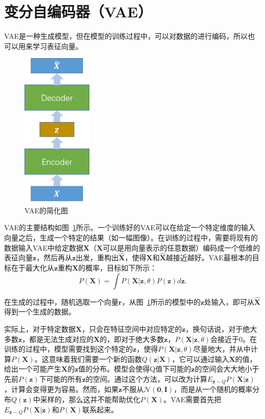 \section{变分自编码器（VAE）}
VAE是一种生成模型，但在模型的训练过程中，可以对数据的进行编码，所以也可以用来学习表征向量。\par
\begin{figure}[h]
  \centering
  \includegraphics[width=0.3\textwidth]{VAE.png}
  \caption{VAE的简化图}
  \label{fig:vae}
\end{figure}
VAE的主要结构如图~\ref{fig:vae}所示。一个训练好的VAE可以在给定一个特定维度的输入向量之后，生成一个特定的结果（如一幅图像）。在训练的过程中，需要将现有的数据输入VAE中给定数据$\bm X$（$\bm X$可以是用向量表示的任意数据）编码成一个低维的表征向量$\bm z$，然后再从$\bm z$出发，重构出$\bm{\hat X}$，使得$\bm X$和$\bm{\hat X}$越接近越好。VAE最根本的目标在于最大化从$\bm z$重构$\bm X$的概率，目标如下所示：
\begin{equation}
\label{eq:baseeq}
P(\bm X)=\int P(\bm X|\bm z, \theta)P(\bm z)d\bm z.
\end{equation}

在生成的过程中，随机选取一个向量$\bm r$，从图~\ref{fig:vae}所示的模型中的$\bm z$处输入，即可从$\bm{\hat X}$得到一个生成的数据。\par

实际上，对于特定数据$\bm X$，只会在特征空间中对应特定的$\bm z$，换句话说，对于绝大多数$\bm z$，都是无法生成对应的$\bm X$的，即对于绝大多数$\bm z$，$P(\bm X|\bm z, \theta)$会接近于0。在训练的过程中，模型需要找到这个特定的$\bm z$，使得$P(\bm X|\bm z, \theta)$尽量地大，并从中计算$P(\bm X)$。这意味着我们需要一个新的函数$Q(\bm z|\bm X)$，它可以通过输入$\bm X$的值，给出一个可能产生$\bm X$的$\bm z$值的分布。模型会使得Q值下可能的$\bm z$的空间会大大地小于先前$P(\bm z)$下可能的所有$\bm z$的空间。通过这个方法，可以改为计算$E_{\bm z\sim Q}P(\bm X|\bm z)$，计算会变得更为容易。然而，如果$\bm z$不服从$\mathcal N(\bm 0, \bm I)$，而是从一个随机的概率分布$Q(\bm z)$中采样的，那么这并不能帮助优化$P(\bm X)$。VAE需要首先把$E_{\bm z\sim Q}P(\bm X|\bm z)$和$P(\bm X)$联系起来。\par

